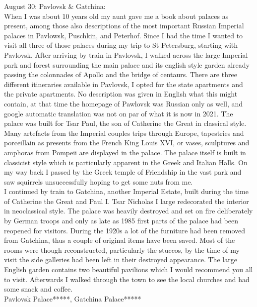August 30: Pavlovsk \& Gatchina:\\
When I was about 10 years old my aunt gave me a book about palaces as present, among those also descriptions of the most important Russian Imperial palaces in Pavlowsk, Puschkin, and Peterhof. Since I had the time I wanted to visit all three of those palaces during my trip to St Petersburg, starting with Pavlovsk. After arriving by train in Pavlovsk, I walked across the large Imperial park and forest surrounding the main palace and its english style garden already passing the colonnades of Apollo and the bridge of centaurs. There are three different itineraries available in Pavlovsk, I opted for the state apartments and the private apartments. No description was given in English what this might contain, at that time the homepage of Pawlovsk was Russian only as well, and google automatic translation was not on par of what it is now in 2021. The palace was built for Tsar Paul, the son of Catherine the Great in classical style. Many artefacts from the Imperial couples trips through Europe, tapestries and porceillain as presents from the French King Louis XVI, or vases, sculptures and amphoras from Pompeii are displayed in the palace. The palace itself is built in classicist style which is particularly apparent in the Greek and Italian Halls. On my way back I passed by the Greek temple of Friendship in the vast park and saw squirrels unsuccessfully hoping to get some nuts from me.\\
I continued by train to Gatchina, another Imperial Estate, built during the time of Catherine the Great and Paul I. Tsar Nicholas I large redecorated the interior in neoclassical style. The palace was heavily destroyed and set on fire deliberately by German troops and only as late as 1985 first parts of the palace had been reopened for visitors. During the 1920s a lot of the furniture had been removed from Gatchina, thus a couple of original items have been saved. Most of the rooms were though reconstructed, particularly the stuccos, by the time of my visit the side galleries had been left in their destroyed appearance. The large English garden contains two beautiful pavilions which I would recommend you all to visit. Afterwards I walked through the town to see the local churches and had some snack and coffee.\\

Pavlovsk Palace*****, Gatchina Palace*****\\


